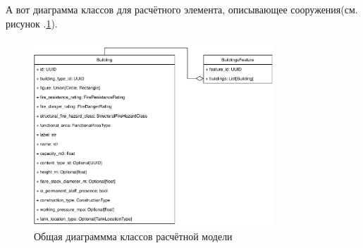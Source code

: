 А вот диаграмма классов для расчётного элемента, описывающее сооружения(см. рисунок .\ref{pic:implementation__model-feature}).
\begin{figure}[H]
	\includegraphics[width=0.8\textwidth]{implementation/pictures/model/feature}
	\caption{Общая диаграммма классов расчётной модели}
	\label{pic:implementation__model-feature}
\end{figure}

